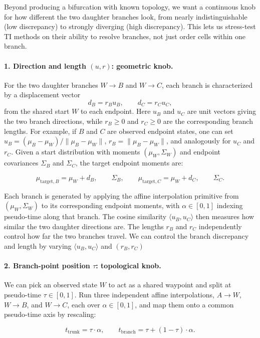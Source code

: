 \documentclass[10pt]{article}
\begin{document}
Beyond producing a bifurcation with known topology, we want a continuous knob for how different the two daughter branches look, from nearly indistinguishable (low discrepancy) to strongly diverging (high discrepancy). This lets us stress-test TI methods on their ability to resolve branches, not just order cells within one branch.

\paragraph{1. Direction and length \((u,r)\): geometric knob.} For the two daughter branches \(W \to B\) and \(W \to C\), each branch is characterized by a displacement vector
\[
d_B = r_B u_B, \qquad d_C = r_C u_C,
\]
from the shared start \(W\) to each endpoint. Here \(u_B\) and \(u_C\) are unit vectors giving the two branch directions, while \(r_B \ge 0\) and \(r_C \ge 0\) are the corresponding branch lengths. For example, if \(B\) and \(C\) are observed endpoint states, one can set \(u_B=(\mu_B-\mu_W)/\|\mu_B-\mu_W\|\), \(r_B=\|\mu_B-\mu_W\|\), and analogously for \(u_C\) and \(r_C\). Given a start distribution with moments \((\mu_W, \Sigma_W)\) and endpoint covariances \(\Sigma_B\) and \(\Sigma_C\), the target endpoint moments are:

\[
\mu_{\text{target},B} = \mu_W + d_B, \qquad \Sigma_B,
\qquad
\mu_{\text{target},C} = \mu_W + d_C, \qquad \Sigma_C.
\]

Each branch is generated by applying the affine interpolation primitive from \((\mu_W, \Sigma_W)\) to its corresponding endpoint moments, with \(\alpha \in [0, 1]\) indexing pseudo-time along that branch. The cosine similarity \(\langle u_B, u_C \rangle\) then measures how similar the two daughter directions are. The lengths \(r_B\) and \(r_C\) independently control how far the two branches travel. We can control the branch discrepancy and length by varying \(\langle u_B, u_C \rangle\) and \((r_B, r_C)\)

\paragraph{2. Branch-point position \(\tau\): topological knob.} We can pick an observed state \(W\) to act as a shared waypoint and split at pseudo-time \(\tau \in [0, 1]\). Run three independent affine interpolations, \(A \to W\), \(W \to B\), and \(W \to C\), each over \(\alpha \in [0, 1]\), and map them onto a common pseudo-time axis by rescaling:

\[
t_{\text{trunk}} = \tau \cdot \alpha, \qquad t_{\text{branch}} = \tau + (1 - \tau) \cdot \alpha.
\]
\end{document}
